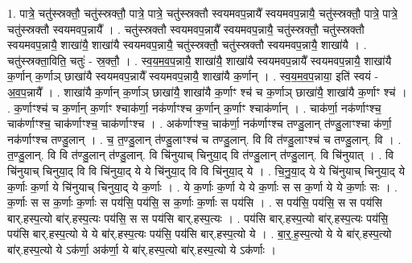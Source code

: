 \documentclass[17pt]{extarticle}
\begin{document}
1. पात्रे॒ चतु॑स्स्रक्तौ॒ चतु॑स्स्रक्तौ॒ पात्रे॒ पात्रे॒ चतु॑स्स्रक्तौ स्वयमवप॒न्नायै᳚ स्वयमवप॒न्नायै॒ चतु॑स्स्रक्तौ॒ पात्रे॒ पात्रे॒ चतु॑स्स्रक्तौ स्वयमवप॒न्नायै᳚ । . चतु॑स्स्रक्तौ स्वयमवप॒न्नायै᳚ स्वयमवप॒न्नायै॒ चतु॑स्स्रक्तौ॒ चतु॑स्स्रक्तौ स्वयमवप॒न्नायै॒ शाखा॑यै॒ शाखा॑यै स्वयमवप॒न्नायै॒ चतु॑स्स्रक्तौ॒ चतु॑स्स्रक्तौ स्वयमवप॒न्नायै॒ शाखा॑यै । . चतु॑स्स्रक्ता॒विति॒ चतुः॑ - स्र॒क्तौ॒ । . स्व॒य॒म॒व॒प॒न्नायै॒ शाखा॑यै॒ शाखा॑यै स्वयमवप॒न्नायै᳚ स्वयमवप॒न्नायै॒ शाखा॑यै क॒र्णान् क॒र्णाञ् छाखा॑यै स्वयमवप॒न्नायै᳚ स्वयमवप॒न्नायै॒ शाखा॑यै क॒र्णान् । . स्व॒य॒म॒व॒प॒न्नाया॒ इति॑ स्वयं - अ॒व॒प॒न्नायै᳚ । . शाखा॑यै क॒र्णान् क॒र्णाञ् छाखा॑यै॒ शाखा॑यै क॒र्णाꣳ श्च॑ च क॒र्णाञ् छाखा॑यै॒ शाखा॑यै क॒र्णाꣳ श्च॑ । . क॒र्णाꣳश्च॑ च क॒र्णान् क॒र्णाꣳ श्चाक॑र्णा॒ नक॑र्णाꣳश्च क॒र्णान् क॒र्णाꣳ श्चाक॑र्णान् । . चाक॑र्णा॒ नक॑र्णाꣳश्च॒ चाक॑र्णाꣳश्च॒ चाक॑र्णाꣳश्च॒ चाक॑र्णाꣳश्च । . अक॑र्णाꣳश्च॒ चाक॑र्णा॒ नक॑र्णाꣳश्च तण्डु॒लान् त॑ण्डु॒लाꣳश्चा क॑र्णा॒ नक॑र्णाꣳश्च तण्डु॒लान् । . च॒ त॒ण्डु॒लान् त॑ण्डु॒लाꣳश्च॑ च तण्डु॒लान्. वि वि त॑ण्डु॒लाꣳश्च॑ च तण्डु॒लान्. वि । . त॒ण्डु॒लान्. वि वि त॑ण्डु॒लान् त॑ण्डु॒लान्. वि चि॑नुयाच् चिनुया॒द् वि त॑ण्डु॒लान् त॑ण्डु॒लान्. वि चि॑नुयात् । . वि चि॑नुयाच् चिनुया॒द् वि वि चि॑नुया॒द् ये ये चि॑नुया॒द् वि वि चि॑नुया॒द् ये । . चि॒नु॒या॒द् ये ये चि॑नुयाच् चिनुया॒द् ये क॒र्णाः क॒र्णा ये चि॑नुयाच् चिनुया॒द् ये क॒र्णाः । . ये क॒र्णाः क॒र्णा ये ये क॒र्णाः स स क॒र्णा ये ये क॒र्णाः सः । . क॒र्णाः स स क॒र्णाः क॒र्णाः स पय॑सि॒ पय॑सि॒ स क॒र्णाः क॒र्णाः स पय॑सि । . स पय॑सि॒ पय॑सि॒ स स पय॑सि बार्.हस्प॒त्यो बा॑र्.हस्प॒त्यः पय॑सि॒ स स पय॑सि बार्.हस्प॒त्यः । . पय॑सि बार्.हस्प॒त्यो बा॑र्.हस्प॒त्यः पय॑सि॒ पय॑सि बार्.हस्प॒त्यो ये ये बा॑र्.हस्प॒त्यः पय॑सि॒ पय॑सि बार्.हस्प॒त्यो ये । . बा॒र्॒.ह॒स्प॒त्यो ये ये बा॑र्.हस्प॒त्यो बा॑र्.हस्प॒त्यो ये ऽक॑र्णा॒ अक॑र्णा॒ ये बा॑र्.हस्प॒त्यो बा॑र्.हस्प॒त्यो ये ऽक॑र्णाः । \newline
\end{document}

